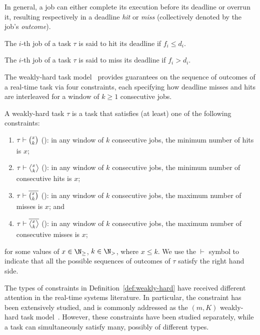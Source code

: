 In general, a job can either complete its execution before its deadline or overrun it, resulting respectively in a deadline \emph{hit} or \emph{miss} (collectively denoted by the job's \emph{outcome}).
%
\begin{definition}%
\label{def:hit}%
    The $i$-th job of a task $\tau$ is said to hit its deadline if $f_i \leq d_i$.
\end{definition}
%
\begin{definition}%
\label{def:miss}%
    The $i$-th job of a task $\tau$ is said to miss its deadline if $f_i > d_i$.
\end{definition}
%
The weakly-hard task model~\cite{Bernat:2001, Bernat:1998} provides guarantees on the sequence of outcomes of a real-time task via four constraints, each specifying how deadline misses and hits are interleaved for a window of $k \geq 1$ consecutive jobs.
%
\begin{definition}%
\label{def:weakly-hard}%
    A weakly-hard task $\tau$ is a task that satisfies (at least) one of the following constraints:
    \begin{enumerate}[label=(\roman*)]
        \item \label{item:AnyHit} $\tau \vdash \binom{x_{}}{k_{}}$ (\tAH{}): in any window of $k$ consecutive jobs, the minimum number of hits is $x$;
        \item \label{item:RowHit} $\tau \vdash \rowhit{}$ (\tRH{}): in any window of $k$ consecutive jobs, the minimum number of consecutive hits is $x$;
        \item \label{item:AnyMiss} $\tau \vdash \overline{\binom{x_{}}{k_{}}}$ (\tAM{}): in any window of $k$ consecutive jobs, the maximum number of misses is $x$; and
        \item \label{item:RowMiss} $\tau \vdash \rowmiss{}$ (\tRM{}): in any window of $k$ consecutive jobs, the maximum number of consecutive misses is $x$;
    \end{enumerate}
    for some values of $x\in \N_{\geq}$, $k \in \N_{>}$, where $x\leq k$. We use the $\vdash$ symbol to indicate that all the possible sequences of outcomes of $\tau$ satisfy the right hand side.
\end{definition}
%
The types of constraints in Definition~\ref{def:weakly-hard} have received different attention in the real-time systems literature. 
In particular, the \tAM{} constraint has been extensively studied, and is commonly addressed as the $(m,K)$ weakly-hard task model~\cite{Hamdaoui:1995, Hammadeh:2017a, Hammadeh:2017b, Sun:2017, Ahrendts:2018, Pazzaglia:2018}. 
However, these constraints have been studied separately, while a task can simultaneously satisfy many, possibly of different types.

